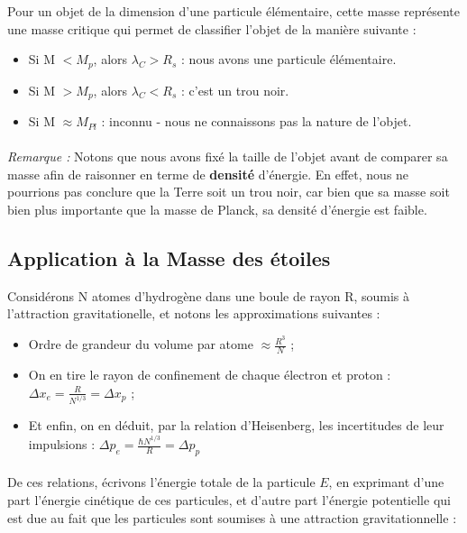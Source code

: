 \documentclass[../Notes de cours]{subfiles}
\begin{document}
Pour un objet de la dimension d'une particule élémentaire, cette masse représente une masse critique qui permet de classifier l'objet de la manière suivante : 
\begin{itemize}
\item Si M $< M_{p}$, alors $\lambda_C > R_s$ : nous avons une particule élémentaire.
\item Si M $> M_{p}$, alors $\lambda_C < R_s$ : c'est un trou noir.
\item Si M $\approx M_{Pl}$ : inconnu - nous ne connaissons pas la nature de l'objet.
\end{itemize}

\paragraph{} \textit{Remarque :} Notons que nous avons fixé la taille de l'objet avant de comparer sa masse afin de raisonner en terme de \textbf{densité} d'énergie. 
En effet, nous ne pourrions pas conclure que la Terre soit un trou noir, car bien que sa masse soit bien plus importante que la masse de Planck, sa densité d'énergie est faible.

\subsection{Application à la Masse des étoiles}
Considérons N atomes d'hydrogène dans une boule de rayon R, soumis à l'attraction gravitationelle, et notons les approximations suivantes : 
\begin{itemize}[label = \textbullet]
    \item Ordre de grandeur du volume par atome $\approx \frac{R^3}{N}$ ;
    \item On en tire le rayon de confinement de chaque électron et proton : $\Delta x_e = \frac{R}{N^{1/3}} = \Delta x_p$ ; 
    \item Et enfin, on en déduit, par la relation d'Heisenberg, les incertitudes de leur impulsions : $\Delta p_e = \frac{\hbar N^{1/3}}{R} = \Delta p_p$
\end{itemize} 

\paragraph{} De ces relations, écrivons l'énergie totale de la particule $E$, en exprimant d'une part l'énergie cinétique de ces particules, et d'autre part l'énergie potentielle qui est due au fait que les particules sont soumises à une attraction gravitationnelle : \\
\end{document}

